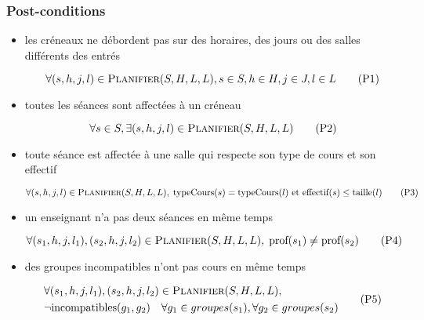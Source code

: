 \subsubsection{Post-conditions}

\begin{itemize}

    \item les créneaux ne débordent pas sur des horaires, des jours ou des
        salles différents des entrés

        \begin{equation}\label{eqn:p1}
            \forall(s, h, j, l) \in \textsc{Planifier}(S, H, L, L),
            s \in S, h \in H, j \in J, l \in L
            \tag{P1}
        \end{equation}

    \item toutes les séances sont affectées à un créneau

        \begin{equation}\label{eqn:p2}
            \forall s \in S,
            \exists(s, h, j, l) \in \textsc{Planifier}(S, H, L, L)
            \tag{P2}
        \end{equation}

    \item toute séance est affectée à une salle qui respecte son type de cours
        et son effectif

        \begin{equation}\label{eqn:p3}
            \forall(s, h, j, l) \in \textsc{Planifier}(S, H, L, L),\;
            \text{typeCours}(s) = \text{typeCours}(l)
            \  \text{et} \  \text{effectif}(s) \leq \text{taille}(l)
            \tag{P3}
        \end{equation}

    \item un enseignant n'a pas deux séances en même temps

        \begin{equation}\label{eqn:p4}
            \forall(s_1, h, j, l_1), (s_2, h, j, l_2)
            \in \textsc{Planifier}(S, H, L, L),\;
            \text{prof}(s_1) \not= \text{prof}(s_2)
            \tag{P4}
        \end{equation}

    \item des groupes incompatibles n'ont pas cours en même temps

        \begin{equation}\label{eqn:p5}
            \begin{split}
                & \forall(s_1, h, j, l_1), (s_2, h, j, l_2)
                \in \textsc{Planifier}(S, H, L, L),\;\\
                & \lnot\text{incompatibles}(g_1, g_2)
                \quad \forall g_1 \in groupes(s_1), \forall g_2 \in groupes(s_2)
            \end{split}
            \tag{P5}
        \end{equation}


\end{itemize}
